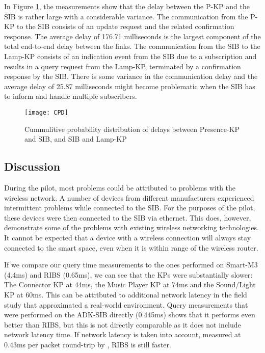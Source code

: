 In Figure \ref{CPD}, the measurements show that the delay between the P-KP and the SIB is rather large with a considerable variance. The communication from the P-KP to the SIB consists of an update request and the related confirmation response. The average delay of 176.71 milliseconds is the largest component of the total end-to-end delay between the links. The communication from the SIB to the Lamp-KP consists of an indication event from the SIB due to a subscription and results in a query request from the Lamp-KP, terminated by a confirmation response by the SIB. There is some variance in the communication delay and the average delay of 25.87 milliseconds might become problematic when the SIB has to inform and handle multiple subscribers.

\begin{figure}
\centering
\texttt{[image: CPD]}
\caption{Cummulitive probability distribution of delays between Presence-KP and SIB, and SIB and Lamp-KP}
\label{CPD}
\end{figure}

\subsection{Discussion}

During the pilot, most problems could be attributed to problems with the wireless network. A number of devices from different manufacturers experienced intermittent problems while connected to the SIB. For the purposes of the pilot, these devices were then connected to the SIB via ethernet. This does, however, demonstrate some of the problems with existing wireless networking technologies. It cannot be expected that a device with a wireless connection will always stay connected to the smart space, even when it is within range of the wireless router.


If we compare our query time measurements to the ones performed on Smart-M3 (4.4ms) and RIBS (0.65ms), we can see that the KPs were substantially slower: The Connector KP at 44ms, the Music Player KP at 74ms and the Sound/Light KP at 60ms. This can be attributed to additional network latency in the field study that approximated a real-world environment. Query measurements that were performed on the ADK-SIB directly (0.445ms) shows that it performs even better than RIBS, but this is not directly comparable as it does not include network latency time. If network latency is taken into account, measured at 0.43ms per packet round-trip by \cite{Etelapera2011}, RIBS is still faster.

